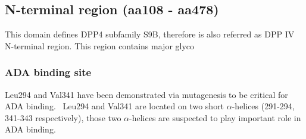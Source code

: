 \subsection{N-terminal region (aa108 - aa478)}

This domain defines DPP4 subfamily S9B, therefore is also referred as DPP IV N-terminal region. This region contains major glyco

\subsubsection{ADA binding site}
Leu294 and Val341 have been demonstrated via mutagenesis to be critical for ADA binding.~\cite{Abbott_1999} Leu294 and Val341 are located on two short $\alpha$-helices (291-294, 341-343 respectively), those two $\alpha$-helices are suspected to play important role in ADA binding. 